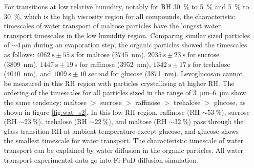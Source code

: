 For transitions at low relative humidity, notably for RH \SI{30}{\percent} to \SI{5}{\percent} and \SI{5}{\percent} to \SI{30}{\percent}, which is the high viscosity region for all compounds, the characteristic timescales of water transport of maltose particles have the longest water transport timescales in the low humidity region. Comparing similar sized particles of $\sim \SI{4}{\micro\meter}$ during an evaporation step, the organic particles showed the timescales as follows: $\SI{4062}{\second} \pm \SI{55}{\second}$ for maltose (\SI{3745}{\nano\meter}), $\SI{2035}{\second} \pm \SI{23}{\second}$ for sucrose (\SI{3809}{\nano\meter}), $\SI{1447}{\second} \pm \SI{19}{\second}$ for raffinose (\SI{3952}{\nano\meter}), $\SI{1342}{\second} \pm \SI{17}{\second}$ for trehalose (\SI{4040}{\nano\meter}), and $\SI{1009}{\second} \pm \SI{10}{second}$ for glucose (\SI{3871}{\nano\meter}). Levoglucosan cannot be measured in this RH region with particles crystallising at higher RH. The ordering of the timescales for all particles sized in the range of \SIrange[range-phrase=--]{3}{6}{\micro\meter} show the same tendency; maltose $>$ sucrose $>$ raffinose $>$ trehalose $>$ glucose, as shown in figure \ref{fig:wat_s2}. In this low RH region, raffinose (RH $\sim \SI{53}{\percent}$)\cite{Song2016a,Tong2011}, sucrose (RH $\sim \SI{23}{\percent}$)\cite{Song2016a,Tong2011}, trehalose (RH $\sim \SI{22}{\percent}$)\cite{Song2016a,chenLiteratureReviewSupplemented2000}, and maltose (RH $\sim \SI{32}{\percent}$)\cite{Song2016a,fosterGlassTransitionRelated2006} pass through the glass transition RH at ambient temperature except glucose, and glucose shows the smallest timescale for water transport. The characteristic timescale of water transport can be explained by water diffusion in the organic particles. All water transport experimental data go into Fi-PaD diffusion simulation.


